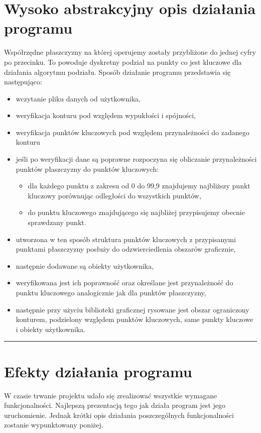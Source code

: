 \documentclass[a4paper,11pt]{article}
\newcommand{\linia}{\rule{\linewidth}{0.4mm}}
\begin{document}
\section{Wysoko abstrakcyjny opis działania programu}
Współrzędne płaszczyzny na której operujemy zostały przybliżone do jednej cyfry po przecinku. To powoduje dyskretny podział na punkty co jest kluczowe dla działania algorytmu podziału.
Sposób działanie programu przedstawia się następująco:
\begin{itemize}
\item  wczytanie pliku danych od użytkownika,
\item  weryfikacja konturu pod względem wypukłości i spójności,
\item  weryfikacja punktów kluczowych pod względem przynależności do zadanego konturu
\item jeśli po weryfikacji dane są poprawne rozpoczyna się obliczanie przynależności punktów płaszczyzny do punktów kluczowych:
\begin{itemize}
\item dla każdego punktu z zakresu od 0 do 99,9 znajdujemy najbliższy  punkt kluczowy porównując odległości do wszystkich punktów,
\item do punktu kluczowego znajdującego się najbliżej przypisujemy obecnie sprawdzany punkt.
\end{itemize}
\item utworzona w ten sposób struktura punktów kluczowych z przypisanymi punktami płaszczyzny posłuży do odzwierciedlenia obszarów graficznie,
\item następnie dodawane są obiekty użytkownika,
\item weryfikowana jest ich poprawność oraz określane jest przynależność do punktu kluczowego analogicznie jak dla punktów płaszczyzny,
\item następnie przy użyciu biblioteki graficznej rysowane jest obszar ograniczony konturem, podzielony względem punktów kluczowych, same punkty kluczowe i obiekty użytkownika.
\end{itemize}


\noindent\linia
\section{Efekty działania programu}
W czasie trwanie projektu udało się zrealizować wszystkie wymagane funkcjonalności. Najlepszą prezentacją tego jak działa program jest jego uruchomienie. Jednak krótki opis działania poszczególnych funkcjonalności zostanie wypunktowany poniżej.
\end{document}
